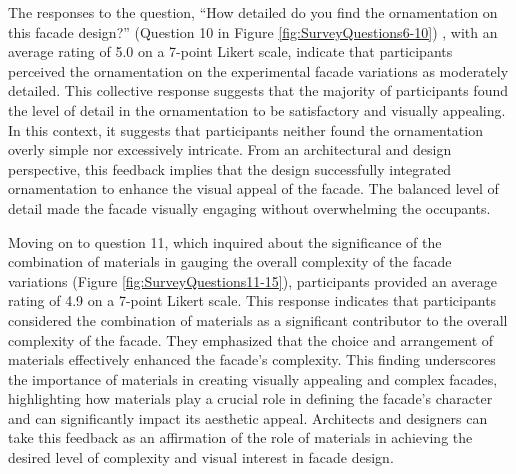 The responses to the question, ``How detailed do you find the ornamentation on this facade design?'' (Question 10 in Figure \ref{fig:SurveyQuestions6-10}) , with an average rating of 5.0 on a 7-point Likert scale, indicate that participants perceived the ornamentation on the experimental facade variations as moderately detailed.
This collective response suggests that the majority of participants found the level of detail in the ornamentation to be satisfactory and visually appealing.
In this context, it suggests that participants neither found the ornamentation overly simple nor excessively intricate.
From an architectural and design perspective, this feedback implies that the design successfully integrated ornamentation to enhance the visual appeal of the facade.
The balanced level of detail made the facade visually engaging without overwhelming the occupants.


Moving on to question 11, which inquired about the significance of the combination of materials in gauging the overall complexity of the facade variations (Figure \ref{fig:SurveyQuestions11-15}), participants provided an average rating of 4.9 on a 7-point Likert scale.
This response indicates that participants considered the combination of materials as a significant contributor to the overall complexity of the facade.
They emphasized that the choice and arrangement of materials effectively enhanced the facade's complexity.
This finding underscores the importance of materials in creating visually appealing and complex facades, highlighting how materials play a crucial role in defining the facade's character and can significantly impact its aesthetic appeal.
Architects and designers can take this feedback as an affirmation of the role of materials in achieving the desired level of complexity and visual interest in facade design.


